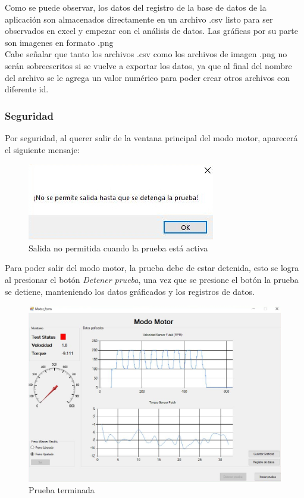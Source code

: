\documentclass[12pt,titlepage]{article}
\begin{document}
Como se puede observar, los datos del registro de la base de datos de la aplicación son almacenados directamente en un archivo .csv listo para ser observados en excel y empezar con el análisis de datos.  Las gráficas por su parte son imagenes en formato .png  \\

Cabe señalar que tanto los archivos .csv como los archivos de imagen .png no serán sobreescritos si se vuelve a exportar los datos, ya que al final del nombre del archivo se le agrega un valor numérico para poder crear otros archivos con diferente id. \\ 
\newpage
\subsubsection{Seguridad}
Por seguridad, al querer salir de la ventana principal del modo motor, aparecerá el siguiente mensaje: 
\begin{figure}[htbp]
\hspace*{6.1cm} 
\includegraphics[scale=0.75]{Security}
\caption{Salida no permitida cuando la prueba está activa}
\end{figure}


Para poder salir del modo motor, la prueba debe de estar detenida, esto se logra al presionar el botón \textit{Detener prueba}, una vez que se presione el botón la prueba se detiene, manteniendo los datos gráficados y los registros de datos. \\ 

\begin{figure}[H]
\hspace*{1.1cm} 
\includegraphics[scale=0.58]{end_test2}
\caption{Prueba terminada}
\end{figure}
\end{document}
